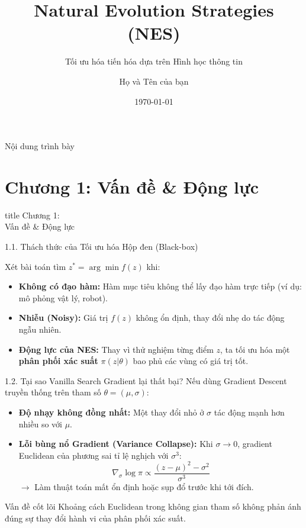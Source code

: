\documentclass[10pt,xcolor=dvipsnames]{beamer}
\title[Natural Evolution Strategies]{Natural Evolution Strategies (NES)}
\subtitle{Tối ưu hóa tiến hóa dựa trên Hình học thông tin}
\author[Tên Bạn]{Họ và Tên của bạn}
\institute[Đại học XYZ]{Khoa Công nghệ thông tin}
\date{\today}
\begin{document}
	
	\begin{frame}
		\titlepage
	\end{frame}
	
	\begin{frame}{Nội dung trình bày}
		\tableofcontents
	\end{frame}
	
	\section{Chương 1: Vấn đề \& Động lực}
	
	\begin{frame}
		\centering
		\begin{beamercolorbox}[sep=16pt,center,shadow=true,rounded=true]{title}
			\huge Chương 1:\\[0.5em] Vấn đề \& Động lực \par
		\end{beamercolorbox}
	\end{frame}
	
	\begin{frame}{1.1. Thách thức của Tối ưu hóa Hộp đen (Black-box)}
		
		Xét bài toán tìm $z^* = \arg \min f(z)$ khi:
		\begin{itemize}
			\item \textbf{Không có đạo hàm:} Hàm mục tiêu không thể lấy đạo hàm trực tiếp (ví dụ: mô phỏng vật lý, robot).
			\item \textbf{Nhiễu (Noisy):} Giá trị $f(z)$ không ổn định, thay đổi nhẹ do tác động ngẫu nhiên.
			\item \textbf{Động lực của NES:} Thay vì thử nghiệm từng điểm $z$, ta tối ưu hóa một \textbf{phân phối xác suất} $\pi(z|\theta)$ bao phủ các vùng có giá trị tốt.
		\end{itemize}
	\end{frame}
	
	\begin{frame}{1.2. Tại sao Vanilla Search Gradient lại thất bại?}
		Nếu dùng Gradient Descent truyền thống trên tham số $\theta = (\mu, \sigma)$:
		\begin{itemize}
			\item \textbf{Độ nhạy không đồng nhất:} Một thay đổi nhỏ ở $\sigma$ tác động mạnh hơn nhiều so với $\mu$.
			\item \textbf{Lỗi bùng nổ Gradient (Variance Collapse):}
			Khi $\sigma \to 0$, gradient Euclidean của phương sai tỉ lệ nghịch với $\sigma^3$:
			\[ \nabla_\sigma \log \pi \propto \frac{(z-\mu)^2 - \sigma^2}{\sigma^3} \]
			$\rightarrow$ Làm thuật toán mất ổn định hoặc sụp đổ trước khi tới đích.
		\end{itemize}
		\begin{alertblock}{Vấn đề cốt lõi}
			Khoảng cách Euclidean trong không gian tham số không phản ánh đúng sự thay đổi hành vi của phân phối xác suất.
		\end{alertblock}
	\end{frame}
	
\end{document}
